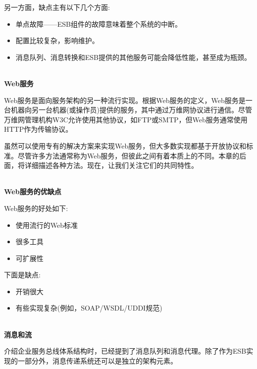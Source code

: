 另一方面，缺点主有以下几个方面:

\begin{itemize}
\item 
单点故障——ESB组件的故障意味着整个系统的中断。

\item 
配置比较复杂，影响维护。

\item 
消息队列、消息转换和ESB提供的其他服务可能会降低性能，甚至成为瓶颈。
\end{itemize}

\hspace*{\fill} \\ %
\noindent
\textbf{Web服务}

Web服务是面向服务架构的另一种流行实现。根据Web服务的定义，Web服务是一台机器向另一台机器(或操作员)提供的服务，其中通过万维网协议进行通信。尽管万维网管理机构W3C允许使用其他协议，如FTP或SMTP，但Web服务通常使用HTTP作为传输协议。

虽然可以使用专有的解决方案来实现Web服务，但大多数实现都基于开放协议和标准。尽管许多方法通常称为Web服务，但彼此之间有着本质上的不同。本章的后面，将详细描述各种方法。现在，让我们关注它们的共同特性。

\hspace*{\fill} \\ %
\noindent
\textbf{Web服务的优缺点}

Web服务的好处如下:

\begin{itemize}
\item 
使用流行的Web标准

\item 
很多工具

\item 
可扩展性
\end{itemize}

下面是缺点:

\begin{itemize}
\item 
开销很大

\item 
有些实现复杂(例如，SOAP/WSDL/UDDI规范)
\end{itemize}

\hspace*{\fill} \\ %
\noindent
\textbf{消息和流}

介绍企业服务总线体系结构时，已经提到了消息队列和消息代理。除了作为ESB实现的一部分外，消息传递系统还可以是独立的架构元素。

